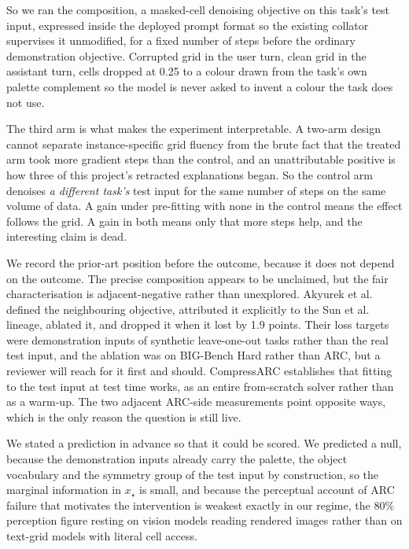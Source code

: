 \documentclass[11pt]{article}
\begin{document}
So we ran the composition, a masked-cell denoising objective on this task's test input, expressed
inside the deployed prompt format so the existing collator supervises it unmodified, for a fixed
number of steps before the ordinary demonstration objective. Corrupted grid in the user turn, clean
grid in the assistant turn, cells dropped at 0.25 to a colour drawn from the task's own palette
complement so the model is never asked to invent a colour the task does not use.

The third arm is what makes the experiment interpretable. A two-arm design cannot separate
instance-specific grid fluency from the brute fact that the treated arm took more gradient steps than
the control, and an unattributable positive is how three of this project's retracted explanations
began. So the control arm denoises \emph{a different task's} test input for the same number of steps
on the same volume of data. A gain under pre-fitting with none in the control means the effect follows the
grid. A gain in both means only that more steps help, and the interesting claim is dead.

We record the prior-art position before the outcome, because it does not depend on the outcome. The
precise composition appears to be unclaimed, but the fair characterisation is adjacent-negative
rather than unexplored. Akyurek et al.~\cite{akyurek2024} defined the neighbouring objective,
attributed it explicitly to the Sun et al. lineage, ablated it, and dropped it when it lost by 1.9
points. Their loss targets were demonstration inputs of synthetic leave-one-out tasks rather than the
real test input, and the ablation was on BIG-Bench Hard rather than ARC, but a reviewer will reach
for it first and should. CompressARC establishes that fitting to the test input at test time works,
as an entire from-scratch solver rather than as a warm-up. The two adjacent ARC-side measurements
point opposite ways, which is the only reason the question is still live.

We stated a prediction in advance so that it could be scored. We predicted a null, because the demonstration
inputs already carry the palette, the object vocabulary and the symmetry group of the test input by
construction, so the marginal information in $x_\star$ is small, and because the perceptual account
of ARC failure that motivates the intervention is weakest exactly in our regime, the 80\% perception
figure resting on vision models reading rendered images rather than on text-grid models with literal
cell access.
\end{document}
